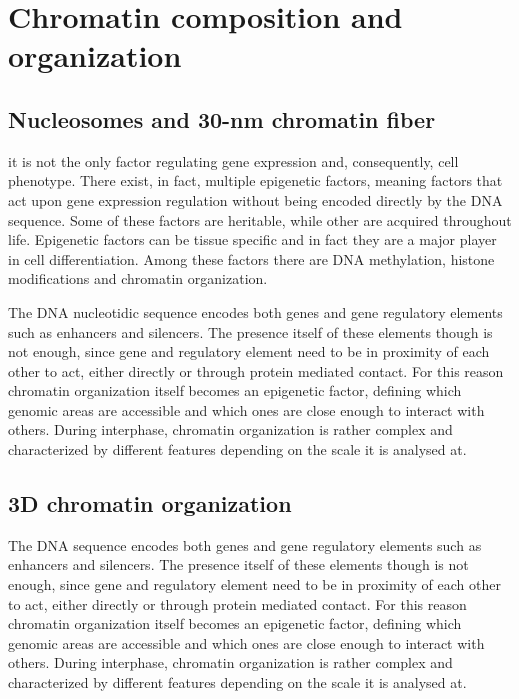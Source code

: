 \section{Chromatin composition and organization}

\subsection{Nucleosomes and 30-nm chromatin fiber}

it is not the only factor regulating gene expression and, consequently, cell phenotype. There exist, in fact, multiple epigenetic factors, meaning factors that act upon gene expression regulation without being encoded directly by the DNA sequence. Some of these factors are heritable, while other are acquired throughout life. Epigenetic factors can be tissue specific and in fact they are a major player in cell differentiation. Among these factors there are DNA methylation, histone modifications and chromatin organization\cite{epigeneticbook2020}.

The DNA nucleotidic sequence encodes both genes and gene regulatory elements such as enhancers and silencers. The presence itself of these elements though is not enough, since gene and regulatory element need to be in proximity of each other to act, either directly or through protein mediated contact. For this reason chromatin organization itself becomes an epigenetic factor, defining which genomic areas are accessible and which ones are close enough to interact with others. During interphase, chromatin organization is rather complex and characterized by different features depending on the scale it is analysed at\cite{chromatinorganization2019, chromatindevelopment2019}.


\subsection{3D chromatin organization}
The DNA sequence encodes both genes and gene regulatory elements such as enhancers and silencers. The presence itself of these elements though is not enough, since gene and regulatory element need to be in proximity of each other to act, either directly or through protein mediated contact. For this reason chromatin organization itself becomes an epigenetic factor, defining which genomic areas are accessible and which ones are close enough to interact with others. During interphase, chromatin organization is rather complex and characterized by different features depending on the scale it is analysed at\cite{chromatinorganization2019, chromatindevelopment2019}.

